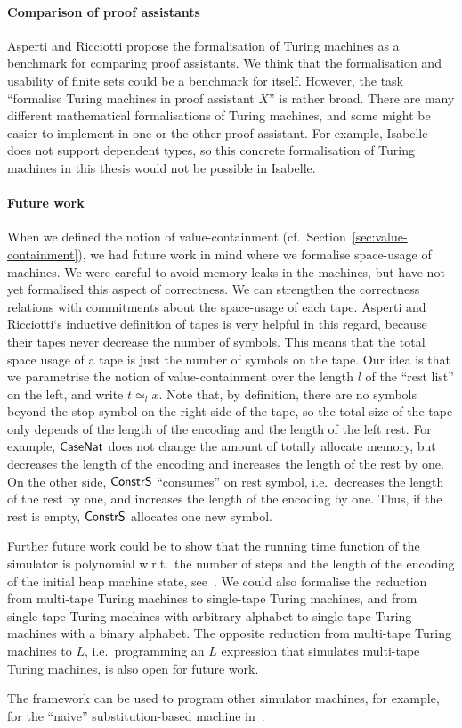 \paragraph{Comparison of proof assistants}
Asperti and Ricciotti\cite{asperti2015} propose the formalisation of Turing machines as a benchmark for comparing proof assistants.  We think that the
formalisation and usability of finite sets could be a benchmark for itself.  However, the task ``formalise Turing machines in proof assistant $X$'' is
rather broad.  There are many different mathematical formalisations of Turing machines, and some might be easier to implement in one or the other
proof assistant.  For example, Isabelle does not support dependent types, so this concrete formalisation of Turing machines in this thesis would not
be possible in Isabelle.



\paragraph{Future work}
When we defined the notion of value-containment (cf.~Section~\ref{sec:value-containment}), we had future work in mind where we formalise space-usage
of machines.  We were careful to avoid memory-leaks in the machines, but have not yet formalised this aspect of correctness.  We can strengthen the
correctness relations with commitments about the space-usage of each tape.  Asperti and Ricciotti`s inductive definition of tapes is very helpful in
this regard, because their tapes never decrease the number of symbols.  This means that the total space usage of a tape is just the number of symbols
on the tape.  Our idea is that we parametrise the notion of value-containment over the length $l$ of the ``rest list'' on the left, and write
$t \simeq_{l} x$.  Note that, by definition, there are no symbols beyond the stop symbol on the right side of the tape, so the total size of the tape
only depends of the length of the encoding and the length of the left rest.  For example, $\mathsf{CaseNat}$ does not change the amount of totally
allocate memory, but decreases the length of the encoding and increases the length of the rest by one.  On the other side, $\mathsf{ConstrS}$ ``consumes''
on rest symbol, i.e.\ decreases the length of the rest by one, and increases the length of the encoding by one.  Thus, if the rest is empty,
$\mathsf{ConstrS}$ allocates one new symbol.

Further future work could be to show that the running time function of the simulator is polynomial w.r.t.\ the number of steps and the length of the
encoding of the initial heap machine state, see~\cite{ForsterLOLA2017}.  We could also formalise the reduction from multi-tape Turing machines to
single-tape Turing machines, and from single-tape Turing machines with arbitrary alphabet to single-tape Turing machines with a binary alphabet.  The
opposite reduction from multi-tape Turing machines to $L$, i.e.\ programming an $L$ expression that simulates multi-tape Turing machines, is also open
for future work.

The framework can be used to program other simulator machines, for example, for the ``naive'' substitution-based machine
in~\cite{KunzeEtAl:2018:Formal}.


